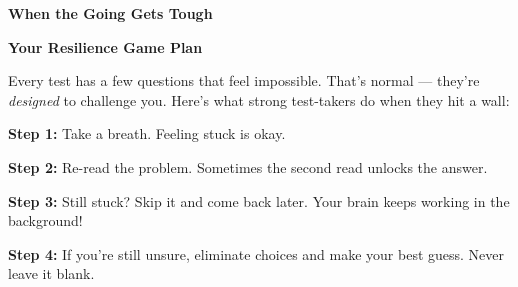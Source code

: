 \clearpage
\thispagestyle{empty}
{\sffamily

\begin{center}
{\fontsize{22}{26}\selectfont\bfseries\color{funTeal} \faMountain\hspace{3mm}When the Going Gets Tough\hspace{3mm}\faMountain}

\vspace{2mm}
{\color{funGray}\hrulefill}
\end{center}

\vspace{3mm}

\begin{tcolorbox}[
    enhanced,
    colback=funTealLight,
    colframe=funTeal!50,
    arc=10pt,
    boxrule=1.5pt,
    left=6mm, right=6mm, top=5mm, bottom=5mm,
]
{\large\bfseries\color{funTealDark} \faShieldAlt\hspace{2mm}Your Resilience Game Plan}

\vspace{2mm}

Every test has a few questions that feel impossible. That's normal — they're \textit{designed} to challenge you. Here's what strong test-takers do when they hit a wall:

\vspace{3mm}

\textcolor{funTeal}{\faArrowRight}\hspace{2mm}\textbf{Step 1:} Take a breath. Feeling stuck is okay.

\vspace{2mm}

\textcolor{funTeal}{\faArrowRight}\hspace{2mm}\textbf{Step 2:} Re-read the problem. Sometimes the second read unlocks the answer.

\vspace{2mm}

\textcolor{funTeal}{\faArrowRight}\hspace{2mm}\textbf{Step 3:} Still stuck? Skip it and come back later. Your brain keeps working in the background!

\vspace{2mm}

\textcolor{funTeal}{\faArrowRight}\hspace{2mm}\textbf{Step 4:} If you're still unsure, eliminate choices and make your best guess. Never leave it blank.
\end{tcolorbox}

}
